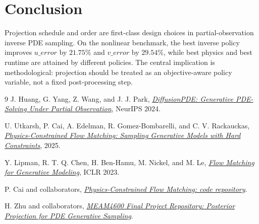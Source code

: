 \documentclass[10pt,twocolumn]{article}
\begin{document}
\section{Conclusion}
Projection schedule and order are first-class design choices in partial-observation inverse PDE sampling. On the nonlinear benchmark, the best inverse policy improves \(u\_error\) by \(21.75\%\) and \(v\_error\) by \(29.54\%\), while best physics and best runtime are attained by different policies. The central implication is methodological: projection should be treated as an objective-aware policy variable, not a fixed post-processing step.

\begingroup
\small
\begin{thebibliography}{9}
J. Huang, G. Yang, Z. Wang, and J. J. Park, \href{https://proceedings.neurips.cc/paper_files/paper/2024/hash/eb3878c1dcbfff9ee95d5d033e5f5942-Abstract-Conference.html}{\emph{DiffusionPDE: Generative PDE-Solving Under Partial Observation}}, NeurIPS 2024.

U. Utkarsh, P. Cai, A. Edelman, R. Gomez-Bombarelli, and C. V. Rackauckas, \href{https://arxiv.org/abs/2506.04171}{\emph{Physics-Constrained Flow Matching: Sampling Generative Models with Hard Constraints}}, 2025.

Y. Lipman, R. T. Q. Chen, H. Ben-Hamu, M. Nickel, and M. Le, \href{https://arxiv.org/abs/2210.02747}{\emph{Flow Matching for Generative Modeling}}, ICLR 2023.

P. Cai and collaborators, \href{https://github.com/cpfpengfei/PCFM}{\emph{Physics-Constrained Flow Matching: code repository}}.

H. Zhu and collaborators, \href{https://github.com/hanshengzhu0001/meam4600_final_proj}{\emph{MEAM4600 Final Project Repository: Posterior Projection for PDE Generative Sampling}}.
\end{thebibliography}
\endgroup
\end{document}
